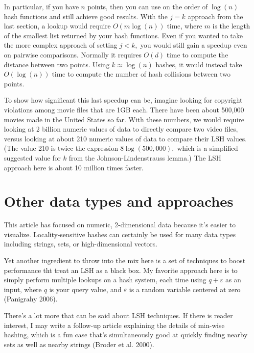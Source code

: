 \documentclass[20pt,]{extarticle}
\begin{document}
In particular, if you have \(n\) points, then you can use on the order
of \(\log(n)\) hash functions and still achieve good results. With the
\(j=k\) approach from the last section, a lookup would require
\(O(m\log(n))\) time, where \(m\) is the length of the smallest list
returned by your hash functions. Even if you wanted to take the more
complex approach of setting \(j < k,\) you would still gain a speedup
even on pairwise comparisons. Normally it requires \(O(d)\) time to
compute the distance between two points. Using \(k \approx \log(n)\)
hashes, it would instead take \(O(\log(n))\) time to compute the number
of hash collisions between two points.

To show how significant this last speedup can be, imagine looking for
copyright violations among movie files that are 1GB each. There have
been about 500,000 movies made in the United States so far. With these
numbers, we would require looking at 2 billion numeric values of data to
directly compare two video files, versus looking at about 210 numeric
values of data to compare their LSH values. (The value 210 is twice the
expression \(8\log(500,000),\) which is a simplified suggested value for
\(k\) from the Johnson-Lindenstrauss lemma.) The LSH approach here is
about 10 million times faster.

\section{Other data types and
approaches}\label{other-data-types-and-approaches}

This article has focused on numeric, 2-dimensional data because it's
easier to visualize. Locality-sensitive hashes can certainly be used for
many data types including strings, sets, or high-dimensional vectors.

Yet another ingredient to throw into the mix here is a set of techniques
to boost performance tht treat an LSH as a black box. My favorite
approach here is to simply perform multiple lookups on a hash system,
each time using \(q + \varepsilon\) as an input, where \(q\) is your
query value, and \(\varepsilon\) is a random variable centered at zero
(Panigrahy 2006).

There's a lot more that can be said about LSH techniques. If there is
reader interest, I may write a follow-up article explaining the details
of min-wise hashing, which is a fun case that's simultaneously good at
quickly finding nearby sets as well as nearby strings (Broder et al.
2000).
\end{document}
